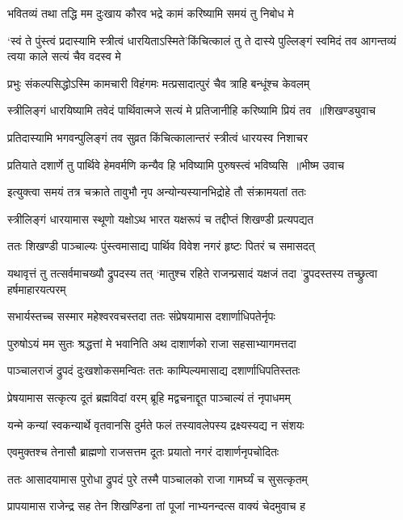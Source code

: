 \twolineshloka
{भवितव्यं तथा तद्धि मम दुःखाय कौरव}
{भद्रे कामं करिष्यामि समयं तु निबोध मे}


\twolineshloka
{`स्वं ते पुंस्त्वं प्रदास्यामि स्त्रीत्वं धारयिताऽस्मिते'किंचित्कालं तु ते दास्ये पुल्लिङ्गं स्वमिदं तव}
{आगन्तव्यं त्वया काले सत्यं चैव वदस्व मे}


\twolineshloka
{प्रभुः संकल्पसिद्धोऽस्मि कामचारी विहंगमः}
{मत्प्रसादात्पुरं चैव त्राहि बन्धूंश्च केवलम्}


\threelineshloka
{स्त्रीलिङ्गं धारयिष्यामि तवेदं पार्थिवात्मजे}
{सत्यं मे प्रतिजानीहि करिष्यामि प्रियं तव ॥शिखण्ड्युवाच}
{}


\twolineshloka
{प्रतिदास्यामि भगवन्पुलिङ्गं तव सुव्रत}
{किंचित्कालान्तरं स्त्रीत्वं धारयस्व निशाचर}


\threelineshloka
{प्रतियाते दशार्णे तु पार्थिवे हेमवर्मणि}
{कन्यैव हि भविष्यामि पुरुषस्त्वं भविष्यसि ॥भीष्म उवाच}
{}


\twolineshloka
{इत्युक्त्वा समयं तत्र चक्राते तावुभौ नृप}
{अन्योन्यस्यानभिद्रोहे तौ संक्रामयतां ततः}


\twolineshloka
{स्त्रीलिङ्गं धारयामास स्थूणो यक्षोऽथ भारत}
{यक्षरूपं च तद्दीप्तं शिखण्डी प्रत्यपद्यत}


\twolineshloka
{ततः शिखण्डी पाञ्चाल्यः पुंस्त्वमासाद्य पार्थिव}
{विवेश नगरं हृष्टः पितरं च समासदत्}


\threelineshloka
{यथावृत्तं तु तत्सर्वमाचख्यौ द्रुपदस्य तत्}
{`मातुश्च रहिते राजन्प्रसादं यक्षजं तदा}
{'द्रुपदस्तस्य तच्छ्रुत्वा हर्षमाहारयत्परम्}


\twolineshloka
{सभार्यस्तच्च सस्मार महेश्वरवचस्तदा}
{ततः संप्रेषयामास दशार्णाधिपतेर्नृपः}


\twolineshloka
{पुरुषोऽयं मम सुतः श्रद्धत्तां मे भवानिति}
{अथ दाशार्णको राजा सहसाभ्यागमत्तदा}


\twolineshloka
{पाञ्चालराजं द्रुपदं दुःखशोकसमन्वितः}
{ततः काम्पिल्यमासाद्य दशार्णाधिपतिस्ततः}


\twolineshloka
{प्रेषयामास सत्कृत्य दूतं ब्रह्मविदां वरम्}
{ब्रूहि मद्वचनाद्दूत पाञ्चाल्यं तं नृपाधमम्}


\twolineshloka
{यन्मे कन्यां स्वकन्यार्थे वृतवानसि दुर्मते}
{फलं तस्यावलेपस्य द्रक्ष्यस्यद्य न संशयः}


\twolineshloka
{एवमुक्तश्च तेनासौ ब्राह्मणो राजसत्तम}
{दूतः प्रयातो नगरं दाशार्णनृपचोदितः}


\twolineshloka
{ततः आसादयामास पुरोधा द्रुपदं पुरे}
{तस्मै पाञ्चालको राजा गामर्घ्यं च सुसत्कृतम्}


\twolineshloka
{प्रापयामास राजेन्द्र सह तेन शिखण्डिना}
{तां पूजां नाभ्यनन्दत्स वाक्यं चेदमुवाच ह}


